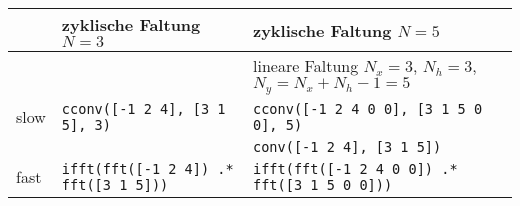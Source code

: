 \begin{table}[h]
\centering
\begin{tabular}{| l | l | l |}
\hline
& zyklische Faltung $N=3$ & zyklische Faltung $N=5$ \\\hline
&  & lineare Faltung $N_x=3$, $N_h=3$, $N_y = N_x+N_h-1=5$ \\\hline
slow  & \texttt{cconv([-1 2 4], [3 1 5], 3)} & \texttt{cconv([-1 2 4 0 0], [3 1 5 0 0], 5)} \\\hline
& &  \texttt{conv([-1 2 4], [3 1 5])} \\\hline
fast  & \texttt{ifft(fft([-1 2 4]) .* fft([3 1 5]))} & \texttt{ifft(fft([-1 2 4 0 0]) .* fft([3 1 5 0 0]))} \\\hline
\end{tabular}
\end{table}


